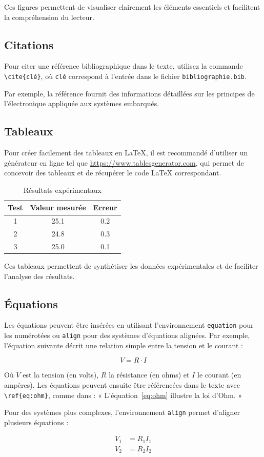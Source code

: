 Ces figures permettent de visualiser clairement les éléments essentiels et facilitent la compréhension du lecteur.

\subsection*{Citations}

Pour citer une référence bibliographique dans le texte, utilisez la commande \verb|\cite{clé}|, où \texttt{clé} correspond à l'entrée dans le fichier \texttt{bibliographie.bib}.  

Par exemple, la référence \cite{floyd2007electronics} fournit des informations détaillées sur les principes de l'électronique appliquée aux systèmes embarqués.

\subsection*{Tableaux}

Pour créer facilement des tableaux en \LaTeX, il est recommandé d'utiliser un générateur en ligne tel que \url{https://www.tablesgenerator.com}, qui permet de concevoir des tableaux et de récupérer le code LaTeX correspondant.

\begin{table}[h]
	\centering
	\caption{Résultats expérimentaux}
	\begin{tabular}{ccc}
		\toprule
		Test & Valeur mesurée & Erreur \\
		\midrule
		1 & 25.1 & 0.2 \\
		2 & 24.8 & 0.3 \\
		3 & 25.0 & 0.1 \\
		\bottomrule
	\end{tabular}
	\label{tab:Résultats}
\end{table}

Ces tableaux permettent de synthétiser les données expérimentales et de faciliter l'analyse des résultats.

\subsection*{Équations}

Les équations peuvent être insérées en utilisant l'environnement \verb|equation| pour les numérotées ou \verb|align| pour des systèmes d'équations alignées. Par exemple, l'équation suivante décrit une relation simple entre la tension et le courant :  

\begin{equation}
	V = R \cdot I
	\label{eq:ohm}
\end{equation}

Où $V$ est la tension (en volts), $R$ la résistance (en ohms) et $I$ le courant (en ampères). Les équations peuvent ensuite être référencées dans le texte avec \verb|\ref{eq:ohm}|, comme dans : « L'équation~\ref{eq:ohm} illustre la loi d'Ohm. »  

Pour des systèmes plus complexes, l'environnement \verb|align| permet d'aligner plusieurs équations :

\begin{align}
	V_1 &= R_1 I_1 \\
	V_2 &= R_2 I_2
\end{align}